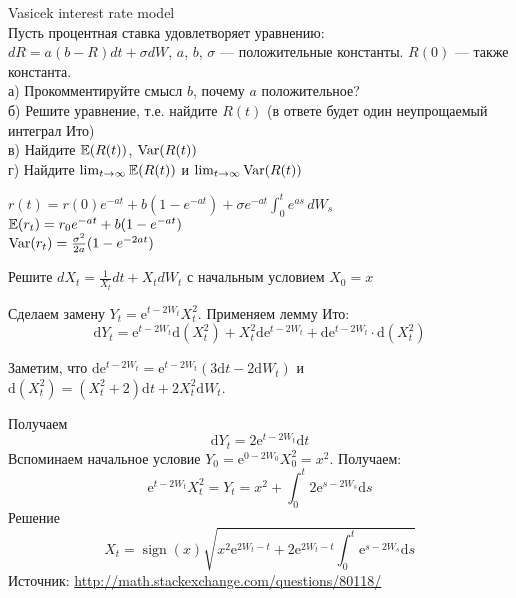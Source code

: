 \begin{problem}
 Vasicek interest rate model \\
Пусть процентная ставка удовлетворяет уравнению: \\
$dR=a(b-R)dt+\sigma dW$, $a$, $b$, $\sigma$ --- положительные константы. $R(0)$ --- также константа. \\
а) Прокомментируйте смысл $b$, почему $a$ положительное? \\
б) Решите уравнение, т.е. найдите $R(t)$ (в ответе будет один неупрощаемый интеграл Ито) \\
в) Найдите $\mathbb{E}(R(t))$, $\operatorname{Var}(R(t))$ \\
г) Найдите $\lim_{t\rightarrow\infty}\mathbb{E}(R(t))$ и $\lim_{t\rightarrow\infty}\operatorname{Var}(R(t))$ 
\end{problem} 
\begin{solution} 


$ r(t) = r(0) e^{-a t} +  b \left(1- e^{-a t}\right) + \sigma e^{-a t}\int_0^t e^{a s}\,dW_s$ \\
$\mathbb{E}(r_t)=r_{0}e^{-at}+b(1-e^{-at})$ \\
$\operatorname{Var}(r_t) = \frac{\sigma^2}{2 a}(1 - e^{-2at})$ 
\end{solution}

\begin{problem}
Решите $dX_t=\frac{1}{X_t}dt+X_tdW_t$ с начальным условием  $X_0=x$
\end{problem} 
\begin{solution} 
Сделаем замену $Y_t = \mathrm{e}^{t- 2 W_t} X_t^2$. Применяем лемму Ито:
\begin{equation}
  \mathrm{d} Y_t = \mathrm{e}^{t- 2 W_t} \mathrm{d} (X_t^2) + X_t^2 \mathrm{d} \mathrm{e}^{t- 2 W_t} + \mathrm{d} \mathrm{e}^{t- 2 W_t} \cdot \mathrm{d} (X_t^2) 
\end{equation}

Заметим, что $\mathrm{d} \mathrm{e}^{t- 2 W_t} = \mathrm{e}^{t- 2 W_t} \left( 3 \mathrm{d} t - 2 \mathrm{d} W_t \right)$ и $\mathrm{d}(X_t^2) = (X_t^2 + 2) \mathrm{d} t + 2 X_t^2 \mathrm{d} W_t$.

Получаем
\begin{equation}
  \mathrm{d} Y_t = 2 \mathrm{e}^{t- 2 W_t} \mathrm{d} t
\end{equation}
Вспоминаем начальное условие $Y_0 = \mathrm{e}^{0 - 2 W_0}X_0^2 = x^2$. Получаем:
\begin{equation}
   \mathrm{e}^{t- 2 W_t} X_t^2 = Y_t =  x^2 + \int_0^t 2 \mathrm{e}^{s - 2 W_s} \mathrm{d} s 
\end{equation}
Решение
\begin{equation}
  X_t = \operatorname{sign}(x) \sqrt{ x^2 \mathrm{e}^{2 W_t - t} + 2 \mathrm{e}^{2 W_t - t} \int_0^t \mathrm{e}^{s - 2 W_s} \mathrm{d} s  }
\end{equation}
Источник: \url{http://math.stackexchange.com/questions/80118/}

\end{solution}

